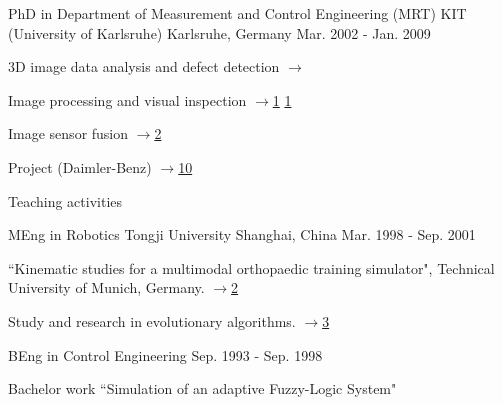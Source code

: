 \documentclass[../cv_xin.tex]{subfiles}
\begin{document}
\begin{cventries}
  \cventry
    {PhD in Department of Measurement and Control Engineering (MRT)} %
    {KIT (University of Karlsruhe)} %
    {Karlsruhe, Germany} %
    {Mar. 2002 - Jan. 2009} %
    {
      \begin{cvitems} %
        \item 3D image data analysis and defect detection \hyperlink{xin2008diss}{$\rightarrow$}
        \item Image processing and visual inspection \hyperlink{xin2009multiscale}{$\rightarrow$1} \hyperlink{xin2007evaluation}{1}
        \item Image sensor fusion \hyperlink{xin2004bildfolgenauswertung}{$\rightarrow$2}
        \item Project (Daimler-Benz)  \hyperlink{Xin_Daimler_08}{$\rightarrow$10}
        \item Teaching activities
      \end{cvitems}
    }

  \cventry
    {MEng in Robotics} %
    {Tongji University} %
    {Shanghai, China} %
    {Mar. 1998 - Sep. 2001} %
    {
      \begin{cvitems} %
        \item ``Kinematic studies for a multimodal orthopaedic training simulator", Technical University of Munich, Germany. \hyperlink{xin2002KneeSimulator}{$\rightarrow$2}
        \item Study and research in evolutionary algorithms. \hyperlink{xin2002AntColony}{$\rightarrow$3}
      \end{cvitems}
    }

  \cventry
    {BEng in Control Engineering} %
    {} %
    {} %
    {Sep. 1993 - Sep. 1998} %
    {
      \begin{cvitems} %
        \item Bachelor work ``Simulation of an adaptive Fuzzy-Logic System"
      \end{cvitems}
    }

\end{cventries}
\end{document}
